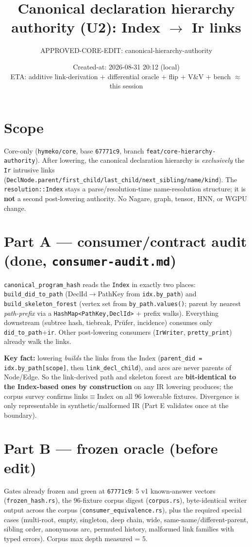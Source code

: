\documentclass[11pt]{article}
\title{Canonical declaration hierarchy authority (U2): Index $\to$ Ir links}
\author{APPROVED-CORE-EDIT: canonical-hierarchy-authority}
\date{Created-at: 2026-08-31 20:12 (local) \\ ETA: additive link-derivation + differential oracle + flip + V\&V + bench $\approx$ this session}
\begin{document}
\maketitle

\section*{Scope}
Core-only (\texttt{hymeko/core}, base \texttt{67771c9}, branch
\texttt{feat/core-hierarchy-authority}). After lowering, the canonical
declaration hierarchy is \emph{exclusively} the \texttt{Ir} intrusive links
(\texttt{DeclNode.parent/first\_child/last\_child/next\_sibling/name/kind}). The
\texttt{resolution::Index} stays a parse/resolution-time name-resolution
structure; it is \textbf{not} a second post-lowering authority. No Nagare, graph,
tensor, HNN, or WGPU change.

\section*{Part A --- consumer/contract audit (done, \texttt{consumer-audit.md})}
\texttt{canonical\_program\_hash} reads the \texttt{Index} in exactly two places:
\texttt{build\_did\_to\_path} (DeclId$\to$PathKey from \texttt{idx.by\_path}) and
\texttt{build\_skeleton\_forest} (vertex set from \texttt{by\_path.values()};
parent by nearest \emph{path-prefix} via a \texttt{HashMap<PathKey,DeclId>} +
prefix walks). Everything downstream (subtree hash, tiebreak, Pr\"ufer,
incidence) consumes only \texttt{did\_to\_path}$+$\texttt{ir}. Other post-lowering
consumers (\texttt{IrWriter}, \texttt{pretty\_print}) already walk the links.

\textbf{Key fact:} lowering \emph{builds} the links from the Index
(\texttt{parent\_did = idx.by\_path[scope]}, then \texttt{link\_decl\_child}), and
arcs are never parents of Node/Edge. So the link-derived path and skeleton forest
are \textbf{bit-identical to the Index-based ones by construction} on any IR
lowering produces; the corpus survey confirms links$\equiv$Index on all 96
lowerable fixtures. Divergence is only representable in synthetic/malformed IR
(Part E validates once at the boundary).

\section*{Part B --- frozen oracle (before edit)}
Gates already frozen and green at \texttt{67771c9}: 5 v1 known-answer vectors
(\texttt{frozen\_hash.rs}), the 96-fixture corpus digest (\texttt{corpus.rs}),
byte-identical writer output across the corpus (\texttt{consumer\_equivalence.rs}),
plus the required special cases (multi-root, empty, singleton, deep chain, wide,
same-name/different-parent, sibling order, anonymous arc, permuted history,
malformed link families with typed errors). Corpus max depth measured = 5.
\end{document}
